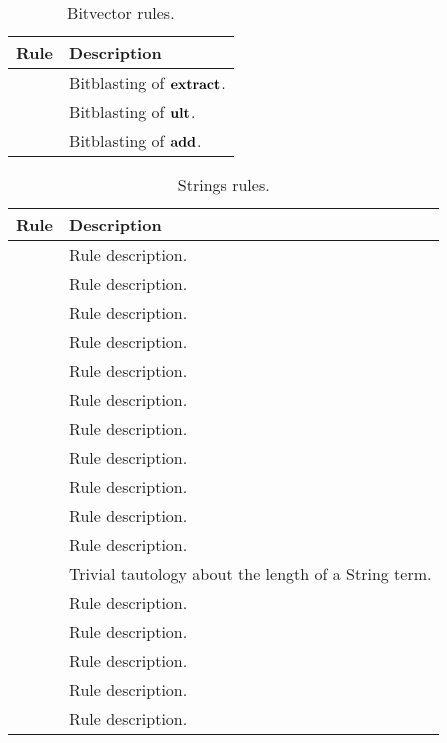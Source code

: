 \begin{xltabular}{\linewidth}{l X}
\caption{Bitvector rules.}
\label{rule-tab:bitblasting}\\
  Rule & Description \\
  \hline
{} & Bitblasting of $\mathbf{extract}$. \\
 & Bitblasting of $\mathbf{ult}$. \\
 & Bitblasting of $\mathbf{add}$. \\
\end{xltabular}

\begin{xltabular}{\linewidth}{l X}
\caption{Strings rules.}
\label{rule-tab:strings}\\
  Rule & Description \\
  \hline
{} & Rule description. \\
 & Rule description. \\
 & Rule description. \\
 & Rule description. \\
 & Rule description. \\
 & Rule description. \\
 & Rule description. \\
 & Rule description. \\
 & Rule description. \\
 & Rule description. \\
 & Rule description. \\
 & Trivial tautology about the length of a String term. \\
 & Rule description. \\
 & Rule description. \\
 & Rule description. \\
 & Rule description. \\
 & Rule description. \\
\end{xltabular}

